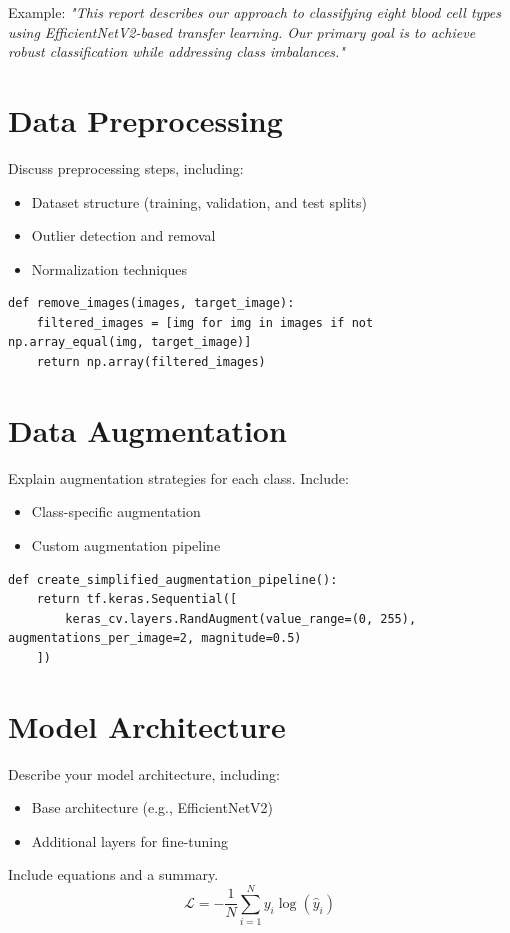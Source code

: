 \documentclass[11pt]{article}
\begin{document}
Example: 
\textit{"This report describes our approach to classifying eight blood cell types using EfficientNetV2-based transfer learning. Our primary goal is to achieve robust classification while addressing class imbalances."}

\section{Data Preprocessing}
Discuss preprocessing steps, including:
\begin{itemize}
    \item Dataset structure (training, validation, and test splits)
    \item Outlier detection and removal
    \item Normalization techniques
\end{itemize}
\begin{lstlisting}[caption={Outlier Removal Example}]
def remove_images(images, target_image):
    filtered_images = [img for img in images if not np.array_equal(img, target_image)]
    return np.array(filtered_images)
\end{lstlisting}

\section{Data Augmentation}
Explain augmentation strategies for each class. Include:
\begin{itemize}
    \item Class-specific augmentation
    \item Custom augmentation pipeline
\end{itemize}
\begin{lstlisting}[caption={Custom Augmentation Pipeline}]
def create_simplified_augmentation_pipeline():
    return tf.keras.Sequential([
        keras_cv.layers.RandAugment(value_range=(0, 255), augmentations_per_image=2, magnitude=0.5)
    ])
\end{lstlisting}

\section{Model Architecture}
Describe your model architecture, including:
\begin{itemize}
    \item Base architecture (e.g., EfficientNetV2)
    \item Additional layers for fine-tuning
\end{itemize}
Include equations and a summary. 
\begin{equation}
\mathcal{L} = -\frac{1}{N}\sum_{i=1}^{N} y_i\log(\hat{y}_i)
\end{equation}
\end{document}
